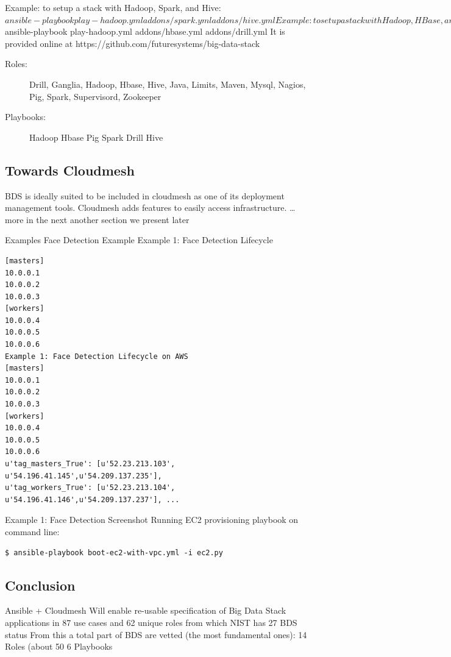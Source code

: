 Example: to setup a stack with Hadoop, Spark, and Hive:
$ ansible-playbook play-hadoop.yml addons/spark.yml addons/hive.yml
Example: to setup a stack with Hadoop, HBase, and Drill:
$ ansible-playbook play-hadoop.yml addons/hbase.yml addons/drill.yml
It is provided online at https://github.com/futuresystems/big-data-stack

\begin{description}

\item[Roles:]
Drill,
Ganglia,
Hadoop,
Hbase,
Hive,
Java,
Limits,
Maven,
Mysql,
Nagios,
Pig,
Spark,
Supervisord,
Zookeeper

\item[Playbooks:]
Hadoop
Hbase
Pig
Spark
Drill
Hive
\end{description}

\subsection{Towards Cloudmesh}
BDS is ideally suited to be included in cloudmesh as one of its deployment management tools. Cloudmesh adds features to easily access infrastructure.
  … more in the next another section we present later

Examples
Face Detection Example
Example 1: Face Detection Lifecycle
\begin{Verbatim}
[masters]
10.0.0.1
10.0.0.2
10.0.0.3
[workers]
10.0.0.4
10.0.0.5
10.0.0.6
Example 1: Face Detection Lifecycle on AWS
[masters]
10.0.0.1
10.0.0.2
10.0.0.3
[workers]
10.0.0.4
10.0.0.5
10.0.0.6
u'tag_masters_True': [u'52.23.213.103', u'54.196.41.145',u'54.209.137.235'],
u'tag_workers_True': [u'52.23.213.104', u'54.196.41.146',u'54.209.137.237'], ...
\end{Verbatim}

Example 1: Face Detection Screenshot Running EC2 provisioning playbook
on command line:

\begin{Verbatim}
$ ansible-playbook boot-ec2-with-vpc.yml -i ec2.py
\end{Verbatim}

\subsection{Conclusion}
Ansible + Cloudmesh
Will enable re-usable specification of Big Data Stack applications in 87 use cases and 62 unique roles from which NIST has 27
BDS status
From this a total part of BDS are vetted (the most fundamental ones): 
14 Roles  (about 50%
6   Playbooks

